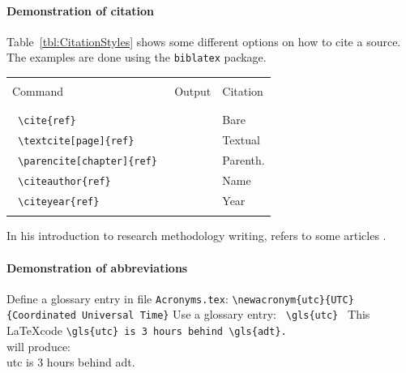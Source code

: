 \paragraph{Demonstration of citation}
Table~\ref{tbl:CitationStyles} shows some different options on how to cite a source. 
The examples are done using the \texttt{biblatex} package.
	\begin{tabular}{lll}
		\hline \\
		Command & 	Output	& Citation \\
		\\
		\hline \\
		\verb! \cite{ref} ! & \cite{Monippally2010} & Bare\\
		\verb! \textcite[page]{ref} ! & \textcite[p. 20]{Monippally2010} & Textual\\
		\verb! \parencite[chapter]{ref} ! & \parencite[chap. 4]{Monippally2010} & Parenth.\\
		
		\verb! \citeauthor{ref} ! & \citeauthor{Monippally2010} & Name\\
		\verb! \citeyear{ref} ! & \citeyear{Monippally2010} & Year\\
		\hline \\
	\end{tabular}  
In his introduction to research methodology writing, \citeauthor{Bouchrika2020} refers to some articles \cite{Bouchrika2020,Choy2014,Holden2004}.

\paragraph{Demonstration of abbreviations}
Define a glossary entry in file \texttt{Acronyms.tex}:
\newline
\verb!\newacronym{utc}{UTC}{Coordinated Universal Time}!
\newline
Use a glossary entry: \verb! \gls{utc} !
\newline
This \LaTeX code \verb*|\gls{utc} is 3 hours behind \gls{adt}.| \\
will produce: \\
\gls{utc} is 3 hours behind \gls{adt}.\\

